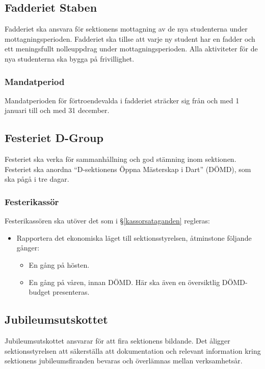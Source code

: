 \documentclass{datateknologsektionen-document}
\begin{document}
\subsection{Fadderiet Staben}
Fadderiet ska ansvara för sektionens mottagning av de nya studenterna under mottagningsperioden.
Fadderiet ska tillse att varje ny student har en fadder och ett meningsfullt nolleuppdrag
under mottagningsperioden. Alla aktiviteter för de nya studenterna ska bygga på frivillighet.

\subsubsection{Mandatperiod}
Mandatperioden för förtroendevalda i fadderiet sträcker sig från och med 1 januari till och med 31 december.

\subsection{Festeriet D-Group}
Festeriet ska verka för sammanhållning och god stämning inom sektionen. Festeriet ska
anordna ``D-sektionens Öppna Mästerskap i Dart'' (DÖMD), som ska pågå i tre dagar.

\subsubsection{Festerikassör}
Festerikassören ska utöver det som i \S \ref{kassorsataganden} regleras:
\begin{itemize}
  \item Rapportera det ekonomiska läget till sektionsstyrelsen, åtminstone följande gånger:
        \begin{itemize}
          \item En gång på hösten.
          \item En gång på våren, innan DÖMD. Här ska även en översiktlig DÖMD-budget presenteras.
        \end{itemize}
\end{itemize}

\subsection{Jubileumsutskottet}
Jubileumsutskottet ansvarar för att fira sektionens bildande. Det åligger sektionsstyrelsen att säkerställa att dokumentation och relevant information kring
sektionens jubileumsfiranden bevaras och överlämnas mellan verksamhetsår.
\end{document}
